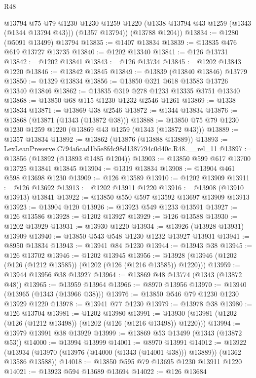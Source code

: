 \begin{lexlean}{R48}
\begin{coremodule}
        @13794
        @75
        @79
        @1230
        @1230
        @1259
        @1220
        (@1338 @13794 @43 @1259 (@1343 (@1344 @13794 @43)))
        (@1357 @13794))
      (@13788 @1204))
@13834 := @1280 (@5091 @13499) @13794
@13835 := @1407 @13834
@13839 := @13835 @476 @619 @13727 @13735
@13840 := @1202 @13340
@13841 := @126 @13731
@13842 := @1202 @13841
@13843 := @126 @13734
@13845 := @1202 @13843 @1220
@13846 := @13842 @13845
@13849 := @13839 (@13840 @13846) @13779
@13850 := @1329 @13834
@13856 := @13850 @321 @618 @13583 @13726 @13340 @13846
@13862 := @13835 @319 @278 @1233 @13335 @3751 @13340
@13868 := @13850 @68 @115 @1230 @1232 @2546 @1261
@13869 := @1338 @13834
@13871 := @13869 @38 @2546
@13872 := @1344 @13834
@13876 := @13868 (@13871 (@1343 (@13872 @38)))
@13888 := @13850 @75 @79 @1230 @1230 @1259 @1220 (@13869 @43 @1259 (@1343 (@13872 @43)))
@13889 := @1357 @13834
@13892 := @13862 (@13876 (@13888 @13889))
@13893 := LexLeanPreserve.C794a6cad1b5e8fdc98d1387794c0d40c.R48.__rel_11
@13897 := @13856 (@13892 (@13893 @1485 @1204))
@13903 := @13850 @599 @617 @13700 @13725 @13841 @13845
@13904 := @1319 @13834
@13908 := @13904 @461 @598 @13698 @1230
@13909 := @126 @13589
@13910 := @1202 @13909
@13911 := @126 @13692
@13913 := @1202 @13911 @1220
@13916 := @13908 (@13910 @13913) @13841
@13922 := @13850 @550 @597 @13592 @13697 @13909 @13913
@13923 := @13904 @120
@13926 := @13923 @549 @1233 @13591
@13927 := @126 @13586
@13928 := @1202 @13927
@13929 := @126 @13588
@13930 := @1202 @13929
@13931 := @13930 @1220
@13934 := @13926 (@13928 @13931) @13909
@13940 := @13850 @543 @548 @1230 @1232 @13927 @13931
@13941 := @8950 @13834
@13943 := @13941 @84 @1230
@13944 := @13943 @38
@13945 := @126 @13702
@13946 := @1202 @13945
@13956 := @13928 (@13946 (@1202 (@126 (@1212 @13585)) (@1202 (@126 (@1216 @13585)) @1220)))
@13959 := @13944 @13956 @38 @13927
@13964 := @13869 @48 @13774 (@1343 (@13872 @48))
@13965 := @13959 @13964
@13966 := @8970 @13956
@13970 := @13940 (@13965 (@1343 (@13966 @38)))
@13976 := @13850 @546 @79 @1230 @1230 @13929 @1220
@13978 := @13941 @77 @1230
@13979 := @13978 @38
@13980 := @126 @13704
@13981 := @1202 @13980
@13991 := @13930 (@13981 (@1202 (@126 (@1212 @13498)) (@1202 (@126 (@1216 @13498)) @1220)))
@13994 := @13979 @13991 @38 @13929
@13999 := @13869 @53 @13499 (@1343 (@13872 @53))
@14000 := @13994 @13999
@14001 := @8970 @13991
@14012 := @13922
    (@13934 (@13970 (@13976 (@14000 (@1343 (@14001 @38))) @13889)) (@1362 @13586 @13588))
@14018 := @13850 @595 @79 @13695 @1230 @13911 @1220
@14021 := @13923 @594 @13689 @13694
@14022 := @126 @13684

\end{coremodule}
\end{lexlean}
